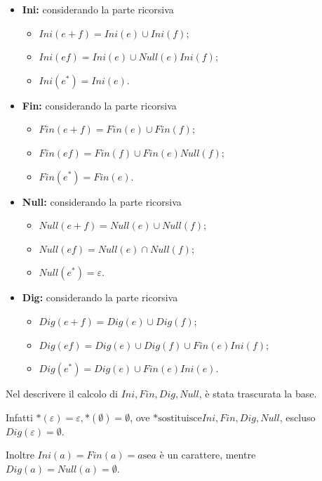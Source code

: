 \documentclass{subfiles}
\begin{document}
\begin{itemize}
    \item \textbf{Ini:}
          considerando la parte ricorsiva
          \begin{itemize}
              \item \(Ini(e + f) = Ini(e) \cup Ini(f)\);
              \item \(Ini(ef) = Ini(e) \cup Null(e) Ini(f)\);
              \item \(Ini(e^{*}) = Ini(e)\).
          \end{itemize}

    \item \textbf{Fin:}
          considerando la parte ricorsiva
          \begin{itemize}
              \item \(Fin(e + f) = Fin(e) \cup Fin(f)\);
              \item \(Fin(ef) = Fin(f) \cup Fin(e) Null(f)\);
              \item \(Fin(e^{*}) = Fin(e)\).
          \end{itemize}

    \item \textbf{Null:}
          considerando la parte ricorsiva
          \begin{itemize}
              \item \(Null(e + f) = Null(e) \cup Null(f)\);
              \item \(Null(ef) = Null(e) \cap Null(f)\);
              \item \(Null(e^{*}) = \varepsilon\).
          \end{itemize}

    \item \textbf{Dig:}
          considerando la parte ricorsiva
          \begin{itemize}
              \item \(Dig(e + f) = Dig(e) \cup Dig(f)\);
              \item \(Dig(ef) = Dig(e) \cup Dig(f) \cup Fin(e)Ini(f)\);
              \item \(Dig(e^{*}) = Dig(e) \cup Fin(e)Ini(e)\).
          \end{itemize}
\end{itemize}

\begin{Note*}
    Nel descrivere il calcolo di \(Ini, Fin, Dig, Null\), è stata trascurata la base.

    \noindent Infatti \(*(\varepsilon) = \varepsilon, *(\emptyset) = \emptyset\), ove \(* \text{sostituisce} Ini, Fin, Dig, Null\), escluso \(Dig(\varepsilon) = \emptyset\).

    \noindent Inoltre \(Ini(a) = Fin(a) = a \text{se} a\) è un carattere, mentre \(Dig(a) = Null(a) = \emptyset\).
\end{Note*}
\end{document}
